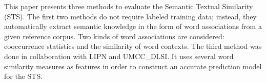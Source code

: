 This paper presents three methods to evaluate the Semantic Textual Similarity (STS). The first two methods do not require labeled training data; instead,
 they automatically extract semantic knowledge in the form of word associations
 from a given reference corpus. Two kinds of word associations are considered:
 cooccurrence statistics and the similarity of word contexts. The third method
 was done in collaboration with LIPN and UMCC\_DLSI. It uses several word
 similarity measures as features in order to construct an accurate prediction
 model for the STS.

